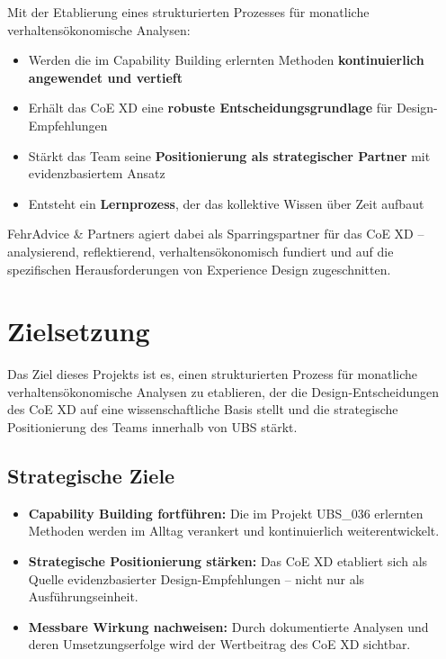 \documentclass{fehradvice-report}
\begin{document}
Mit der Etablierung eines strukturierten Prozesses für monatliche verhaltensökonomische Analysen:

\begin{itemize}
    \item Werden die im Capability Building erlernten Methoden \textbf{kontinuierlich angewendet und vertieft}
    \item Erhält das CoE XD eine \textbf{robuste Entscheidungsgrundlage} für Design-Empfehlungen
    \item Stärkt das Team seine \textbf{Positionierung als strategischer Partner} mit evidenzbasiertem Ansatz
    \item Entsteht ein \textbf{Lernprozess}, der das kollektive Wissen über Zeit aufbaut
\end{itemize}

FehrAdvice \& Partners agiert dabei als Sparringspartner für das CoE XD -- analysierend, reflektierend, verhaltensökonomisch fundiert und auf die spezifischen Herausforderungen von Experience Design zugeschnitten.

\newpage
\section{Zielsetzung}

Das Ziel dieses Projekts ist es, einen strukturierten Prozess für monatliche verhaltensökonomische Analysen zu etablieren, der die Design-Entscheidungen des CoE XD auf eine wissenschaftliche Basis stellt und die strategische Positionierung des Teams innerhalb von UBS stärkt.

\subsection{Strategische Ziele}

\begin{itemize}
    \item[$\checkmark$] \textbf{Capability Building fortführen:} Die im Projekt UBS\_036 erlernten Methoden werden im Alltag verankert und kontinuierlich weiterentwickelt.
    \item[$\checkmark$] \textbf{Strategische Positionierung stärken:} Das CoE XD etabliert sich als Quelle evidenzbasierter Design-Empfehlungen -- nicht nur als Ausführungseinheit.
    \item[$\checkmark$] \textbf{Messbare Wirkung nachweisen:} Durch dokumentierte Analysen und deren Umsetzungserfolge wird der Wertbeitrag des CoE XD sichtbar.
\end{itemize}
\end{document}
